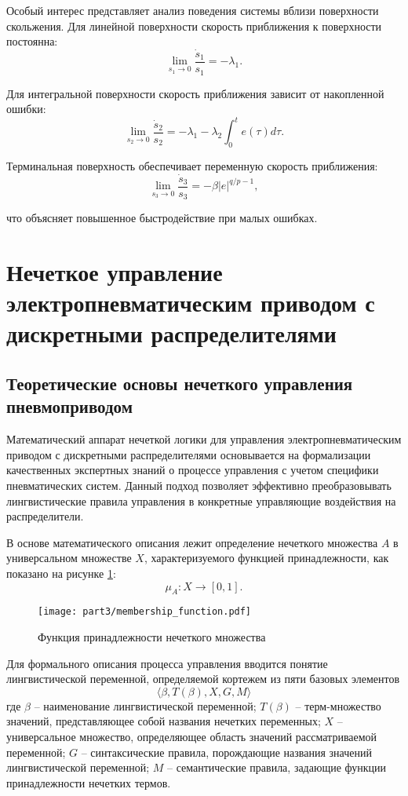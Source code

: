 Особый интерес представляет анализ поведения системы вблизи поверхности скольжения.
Для линейной поверхности скорость приближения к поверхности постоянна:
$$
	\lim_{s_1 \to 0} \frac{\dot{s}_1}{s_1} = -\lambda_1.
$$

Для интегральной поверхности скорость приближения зависит от накопленной ошибки:
$$
	\lim_{s_2 \to 0} \frac{\dot{s}_2}{s_2} = -\lambda_1 - \lambda_2\int_0^t e(\tau)d\tau.
$$

Терминальная поверхность обеспечивает переменную скорость приближения:
$$
	\lim_{s_3 \to 0} \frac{\dot{s}_3}{s_3} = -\beta|e|^{q/p-1},
$$

что объясняет повышенное быстродействие при малых ошибках.

\section{Нечеткое управление электропневматическим приводом с дискретными распределителями}\label{sec:ch3/sec4}
\subsection{Теоретические основы нечеткого управления пневмоприводом}\label{subsec:ch3/sec4/sub1}

Математический аппарат нечеткой логики для управления электропневматическим приводом
с дискретными распределителями основывается на формализации качественных экспертных знаний
о процессе управления с учетом специфики пневматических систем. Данный подход позволяет эффективно
преобразовывать лингвистические правила управления в конкретные управляющие воздействия на распределители.

В основе математического описания лежит определение нечеткого множества $A$ в
универсальном множестве $X$, характеризуемого
функцией принадлежности, как показано на рисунке \ref{fig:membership_functions}:
\begin{equation*}
	\mu_A: X \rightarrow \left[0,1\right].
\end{equation*}

\begin{figure}[ht]
	\centering
	\texttt{[image: part3/membership\_function.pdf]}
	\caption{Функция принадлежности нечеткого множества}
	\label{fig:membership_functions}
\end{figure}

Для формального описания процесса управления вводится понятие лингвистической переменной,
определяемой кортежем из пяти базовых элементов
\begin{equation*}
	\langle \beta, T(\beta), X, G, M \rangle
\end{equation*}
где $\beta$ -- наименование лингвистической переменной;
$T(\beta)$ -- терм-множество значений, представляющее собой названия нечетких переменных;
$X$ -- универсальное множество, определяющее область значений рассматриваемой переменной;
$G$ -- синтаксические правила, порождающие названия значений лингвистической переменной;
$M$ -- семантические правила, задающие функции принадлежности нечетких термов.

